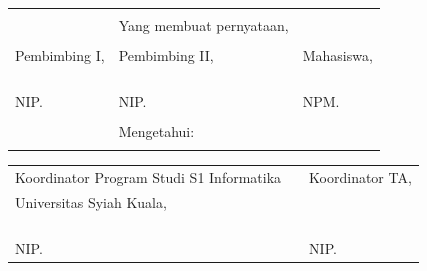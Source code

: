 \begin{singlespace}
\vspace{0.4cm}
{\renewcommand{\arraystretch}{0.8}
\centering
\begin{tabularx}{\textwidth}{l l p{6cm}} %
	&\tanggalSuratPernyataan		& \\
	&Yang membuat pernyataan,			& \\
	&&\\
	Pembimbing I,							&Pembimbing II,							&Mahasiswa,\\
	&&\\
	&&\\
	&&\\
	\underline{\pembimbingSatu}	&\underline{\pembimbingDua} &\underline{\penulis}\\
	NIP. \nipPembimbingSatu				&NIP. \nipPembimbingDua				&NPM. \npm \\
	&&\\
	&Mengetahui:\\			&
\end{tabularx}
}
{\renewcommand{\arraystretch}{0.8}
\begin{tabularx}{\textwidth}{llX} %
	Koordinator Program Studi S1 Informatika	&\qquad\qquad  &Koordinator TA,\\
	Universitas Syiah Kuala,&\quad\quad  &\\
	&&\\
	&&\\
	&&\\
	\underline{\kaprodi}	&\quad\quad  &\underline{\koordinatorTA}\\
	NIP. \kaprodinip						&\quad\quad  &NIP. \koordinatorTAnip				
\end{tabularx}
}
\end{singlespace}